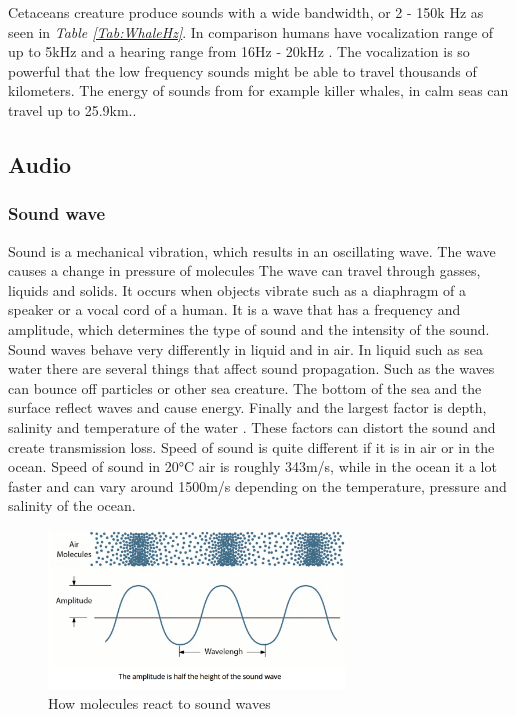 Cetaceans creature produce sounds with a wide bandwidth, or 2 - 150k Hz as seen in \textit{Table \ref{Tab:WhaleHz}}.
In comparison humans have vocalization range of up to 5kHz and a hearing range from 16Hz - 20kHz \cite{monson_perceptual_2014}.
The vocalization is so powerful that the low frequency sounds might be able to travel thousands of kilometers\cite{nowacek_studying_2016}.
The energy of sounds from for example killer whales, in calm seas can travel up to 25.9km.\cite{miller_diversity_2006}.

\newpage

\subsection{Audio}

\subsubsection{Sound wave}

Sound is a mechanical vibration, which results in an oscillating wave.
The wave causes a change in pressure of molecules 
The wave can travel through gasses, liquids and solids.
It occurs when objects vibrate such as a diaphragm of a speaker or a vocal cord of a human.
It is a wave that has a frequency and amplitude, which determines the type of sound and the intensity of the sound.
Sound waves behave very differently in liquid and in air.
In liquid such as sea water there are several things that affect sound propagation.
Such as the waves can bounce off particles or other sea creature. 
The bottom of the sea and the surface reflect waves and cause energy.
Finally and the largest factor  is depth, salinity and temperature of the water .
These factors can distort the sound and create transmission loss\cite{noauthor_sonar_nodate}.
Speed of sound is quite different if it is in air or in the ocean.
Speed of sound in 20°C air is roughly 343m/s, while  in the ocean it a lot faster and can vary around 1500m/s depending on the temperature, pressure and salinity of the ocean. 

\begin{figure}[h]
    \centering
    \includegraphics[width=0.70\textwidth]{graphics/soundwaves.png}
    \caption{How molecules react to sound waves \cite{noauthor_what_nodate}}
    \label{fig:SoundWaves}
\end{figure}

